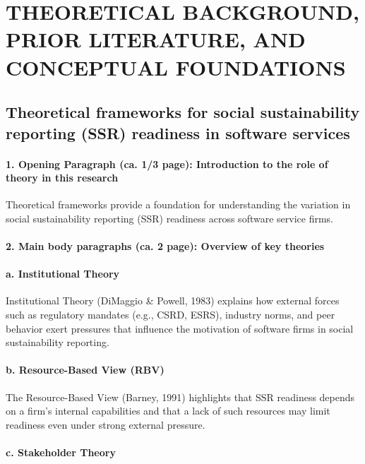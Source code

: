 \chapter{THEORETICAL BACKGROUND, PRIOR LITERATURE, AND CONCEPTUAL FOUNDATIONS}

\section{Theoretical frameworks for social sustainability reporting (SSR) readiness in software services}

\subsubsection{1. Opening Paragraph (ca. 1/3 page): Introduction to the role of theory in this research}

Theoretical frameworks provide a foundation for understanding the variation 
in social sustainability reporting (SSR) readiness across software service firms.

\subsubsection{2. Main body paragraphs (ca. 2 page): Overview of key theories}

\vspace{8pt}
\subsubsection{a. Institutional Theory}

Institutional Theory (DiMaggio \& Powell, 1983) explains how external forces such as regulatory mandates (e.g., CSRD, ESRS),
industry norms, and peer behavior exert pressures that influence the motivation of software firms in 
social sustainability reporting.

\subsubsection{b. Resource-Based View (RBV)}

The Resource-Based View (Barney, 1991) highlights that SSR readiness depends on a firm's internal capabilities 
and that a lack of such resources may limit readiness even under strong external pressure.

\subsubsection{c. Stakeholder Theory}

